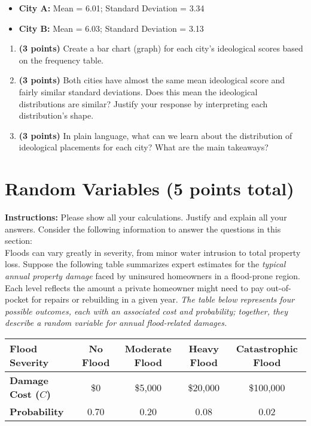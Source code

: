 \documentclass{article}
\newcommand{\blankbox}[2][3cm]{%
    \vspace{-0.5em}
    \begin{figure}[H]
        \makebox[\linewidth]{%
            \begin{tcolorbox}[
                colback=white, 
                colframe=white,  %
                width=#2, %
                height=#1,
                boxrule=0.2mm
            ]
            \end{tcolorbox}
        }
    \end{figure}
    \vspace{-2em}
}
\begin{document}
\begin{itemize}
\item \textbf{City A:} Mean = 6.01; Standard Deviation = 3.34
\item \textbf{City B:} Mean = 6.03; Standard Deviation = 3.13
\end{itemize}

\begin{enumerate}
\item \textbf{(3 points)} Create a bar chart (graph) for each city's ideological scores based on the frequency table. \blankbox[6cm]{1.0\linewidth} %

\item \textbf{(3 points)} Both cities have almost the same mean ideological score and fairly similar standard deviations. Does this mean the ideological distributions are similar? Justify your response by interpreting each distribution's shape. \blankbox[4.75cm]{1.0\linewidth}

\item \textbf{(3 points)} In plain language, what can we learn about the distribution of ideological placements for each city? What are the main takeaways? %
\end{enumerate}

\newpage

\section{Random Variables (5 points total)}
\noindent\textbf{Instructions:} Please show all your calculations. Justify and explain all your answers. Consider the following information to answer the questions in this section: \\

Floods can vary greatly in severity, from minor water intrusion to total property loss. Suppose the following table summarizes expert estimates for the \emph{typical annual property damage} faced by uninsured homeowners in a flood-prone region. Each level reflects the amount a private homeowner might need to pay out-of-pocket for repairs or rebuilding in a given year. \textit{The table below represents four possible outcomes, each with an associated cost and probability; together, they describe a random variable for annual flood-related damages.}

\begin{center}
\begin{tabular}{|l|c|c|c|c|}
\hline
\textbf{Flood Severity} & No Flood & Moderate Flood & Heavy Flood & Catastrophic Flood \\
\hline
\textbf{Damage Cost ($C$)} & \$0 & \$5,000 & \$20,000 & \$100,000 \\
\hline
\textbf{Probability} & 0.70 & 0.20 & 0.08 & 0.02 \\
\hline
\end{tabular}
\end{center}
\end{document}
